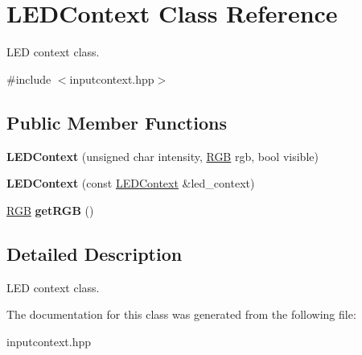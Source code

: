 \hypertarget{classLEDContext}{}\section{L\+E\+D\+Context Class Reference}
\label{classLEDContext}


L\+ED context class.  




{\ttfamily \#include $<$inputcontext.\+hpp$>$}

\subsection*{Public Member Functions}
\begin{DoxyCompactItemize}
\item 
\mbox{\label{classLEDContext_a595fe959a611f75c6791ab40b1fb5dc0}} 
{\bfseries L\+E\+D\+Context} (unsigned char intensity, \hyperlink{structRGB}{R\+GB} rgb, bool visible)
\item 
\mbox{\label{classLEDContext_a341d5800ea8fefee47326c9a78e909ec}} 
{\bfseries L\+E\+D\+Context} (const \hyperlink{classLEDContext}{L\+E\+D\+Context} \&led\+\_\+context)
\item 
\mbox{\label{classLEDContext_a774a2e7001b38ed6bc74d721bc97715a}} 
\hyperlink{structRGB}{R\+GB} {\bfseries get\+R\+GB} ()
\end{DoxyCompactItemize}


\subsection{Detailed Description}
L\+ED context class. 

The documentation for this class was generated from the following file\+:\begin{DoxyCompactItemize}
\item 
inputcontext.\+hpp\end{DoxyCompactItemize}
